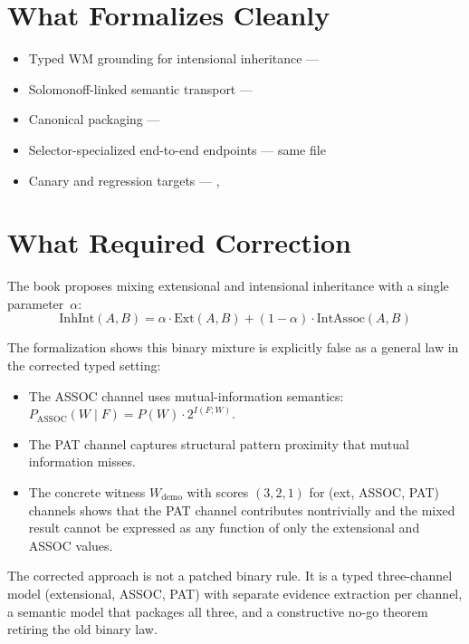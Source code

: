\documentclass[11pt,openany]{report}
\begin{document}
\section{What Formalizes Cleanly}

\begin{itemize}
\item Typed WM grounding for intensional inheritance ---
\item Solomonoff-linked semantic transport ---
\item Canonical  packaging ---
\item Selector-specialized end-to-end endpoints ---
  same file
\item Canary and regression targets ---
  ,
\end{itemize}

\section{What Required Correction}

The book proposes mixing extensional and intensional inheritance with a
single parameter~$\alpha$:
\[
  \mathrm{InhInt}(A, B) = \alpha \cdot \mathrm{Ext}(A, B)
  + (1 - \alpha) \cdot \mathrm{IntAssoc}(A, B)
\]

The formalization shows this binary mixture is explicitly false as a
general law in the corrected typed setting:

\begin{itemize}
\item The ASSOC channel uses mutual-information semantics:
  $P_{\mathrm{ASSOC}}(W \mid F) = P(W) \cdot 2^{I(F;W)}$.
\item The PAT channel captures structural pattern proximity that mutual
  information misses.
\item The concrete witness $W_{\mathrm{demo}}$ with scores $(3, 2, 1)$
  for (ext, ASSOC, PAT) channels shows that the PAT channel contributes
  nontrivially and the mixed result cannot be expressed as any function
  of only the extensional and ASSOC values.
\end{itemize}

The corrected approach is not a patched binary rule.  It is a typed
three-channel model (extensional, ASSOC, PAT) with separate evidence
extraction per channel, a semantic model that packages all three, and a
constructive no-go theorem retiring the old binary law.
\end{document}
